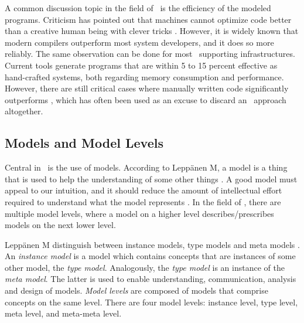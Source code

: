 A common discussion topic in the field of \mde~is the efficiency of the modeled programs. Criticism has pointed out that machines cannot optimize code better than a creative human being with clever tricks \cite{Selic2003-qa}. However, it is widely known that modern compilers outperform most system developers, and it does so more reliably. The same observation can be done for most \mdd~supporting infrastructures. Current tools generate programs that are within 5 to 15 percent effective as hand-crafted systems, both regarding memory consumption and performance. However, there are still critical cases where manually written code significantly outperforms \mde, which has often been used as an excuse to discard an \mdd~approach altogether. 

\subsection{Models and Model Levels}
\label{sub:Models and Model Levels}
Central in \mde~is the use of models. According to Leppänen M, a model is a thing that is used to help the understanding of some other things \cite{Leppanen2006-ay}. A good model must appeal to our intuition, and it should reduce the amount of intellectual effort required to understand what the model represents \cite{Selic2003-qa}. In the field of \mdd, there are multiple model levels, where a model on a higher level describes/prescribes models on the next lower level. 

Leppänen M distinguish between instance models, type models and meta models \cite{Leppanen2006-ay}. An \textit{instance model} is a model which contains concepts that are instances of some other model, the \textit{type model}. Analogously, the \textit{type model} is an instance of the \textit{meta model}. The latter is used to enable understanding, communication, analysis and design of models. \textit{Model levels} are composed of models that comprise concepts on the same level. There are four model levels: instance level, type level, meta level, and meta-meta level.


